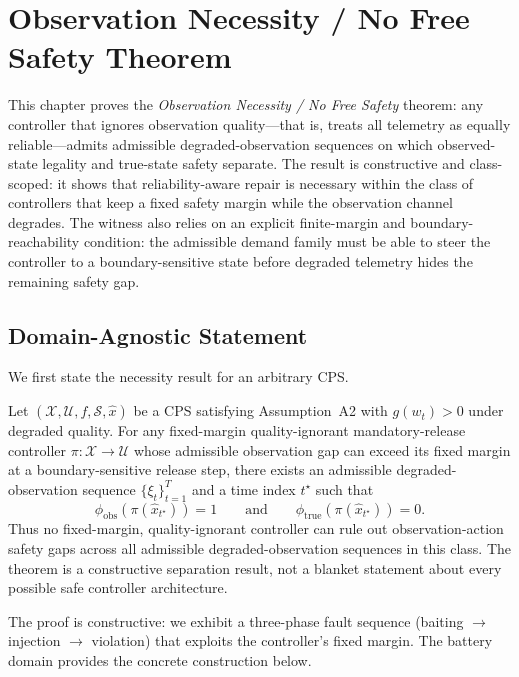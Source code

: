 
\chapter{Observation Necessity / No Free Safety Theorem}
\label{ch:no-free-safety}

This chapter proves the \emph{Observation Necessity / No Free Safety} theorem: any controller
that ignores observation quality---that is, treats all telemetry as
equally reliable---admits admissible degraded-observation sequences on which
observed-state legality and true-state safety separate.  The result is
constructive and class-scoped: it shows that reliability-aware repair is
necessary within the class of controllers that keep a fixed safety margin
while the observation channel degrades.  The witness also relies on an
explicit finite-margin and boundary-reachability condition: the admissible
demand family must be able to steer the controller to a boundary-sensitive
state before degraded telemetry hides the remaining safety gap.

\section{Domain-Agnostic Statement}

We first state the necessity result for an arbitrary CPS.

\begin{theorem}
\label{thm:no-free-safety-general}
Let $(\mathcal{X}, \mathcal{U}, f, \mathcal{S}, \hat{x})$ be a CPS
satisfying Assumption~A2 with $g(w_t) > 0$ under degraded quality.
For any fixed-margin quality-ignorant mandatory-release controller
$\pi : \mathcal{X} \to \mathcal{U}$ whose admissible observation gap can exceed
its fixed margin at a boundary-sensitive release step, there exists an
admissible degraded-observation sequence $\{\xi_t\}_{t=1}^T$ and a time index
$t^\star$ such that
\[
  \phi_{\mathrm{obs}}(\pi(\hat{x}_{t^\star})) = 1
  \qquad\text{and}\qquad
  \phi_{\mathrm{true}}(\pi(\hat{x}_{t^\star})) = 0.
\]
Thus no fixed-margin, quality-ignorant controller can rule out
observation-action safety gaps across all admissible degraded-observation
sequences in this class.  The theorem is a constructive separation result,
not a blanket statement about every possible safe controller architecture.
\end{theorem}

The proof is constructive: we exhibit a three-phase fault sequence
(baiting $\to$ injection $\to$ violation) that exploits the controller's
fixed margin.  The battery domain provides the concrete construction below.

